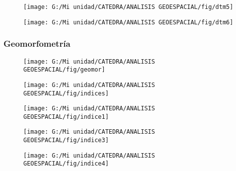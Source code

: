 \documentclass[14pt]{beamer}
\begin{document}
\begin{frame}
  \begin{figure}
    \centering
    \texttt{[image: G:/Mi unidad/CATEDRA/ANALISIS GEOESPACIAL/fig/dtm5]}
  \end{figure}
\end{frame}
\begin{frame}
  \begin{figure}
    \centering
    \texttt{[image: G:/Mi unidad/CATEDRA/ANALISIS GEOESPACIAL/fig/dtm6]}
  \end{figure}
\end{frame}
\begin{frame}
\frametitle{Geomorfometría}
  \begin{figure}
    \centering
    \texttt{[image: G:/Mi unidad/CATEDRA/ANALISIS GEOESPACIAL/fig/geomor]}
  \end{figure}
\end{frame}
\begin{frame}
  \begin{figure}
    \centering
    \texttt{[image: G:/Mi unidad/CATEDRA/ANALISIS GEOESPACIAL/fig/indices]}
  \end{figure}
\end{frame}
\begin{frame}
  \begin{figure}
    \centering
    \texttt{[image: G:/Mi unidad/CATEDRA/ANALISIS GEOESPACIAL/fig/indice1]}
  \end{figure}
\end{frame}
\begin{frame}
  \begin{figure}
    \centering
    \texttt{[image: G:/Mi unidad/CATEDRA/ANALISIS GEOESPACIAL/fig/indice3]}
  \end{figure}
\end{frame}
\begin{frame}
  \begin{figure}
    \centering
    \texttt{[image: G:/Mi unidad/CATEDRA/ANALISIS GEOESPACIAL/fig/indice4]}
  \end{figure}
\end{frame}
\end{document}
